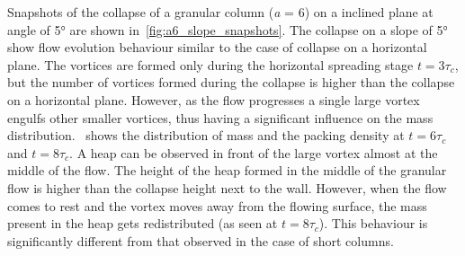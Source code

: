 Snapshots of the collapse of a granular column (\textit{a} = 6) on a inclined 
plane at angle of 5\si{\degree} are shown in~\cref{fig:a6_slope_snapshots}. 
The collapse on a slope of 5\si{\degree} show flow evolution behaviour similar 
to the case of collapse on a horizontal plane. The vortices are formed only 
during the horizontal spreading stage $t = 3\tau_c$, but the number of vortices 
formed during the collapse is higher than the collapse on a horizontal plane. 
However, as the flow progresses a single large vortex engulfs other smaller 
vortices, thus having a significant influence on the mass 
distribution.~ shows 
the distribution of mass and the packing density at $t = 6\tau_c$ and $t = 
8\tau_c$. A heap can be observed in front of the large vortex almost at the 
middle of the flow. The height of the heap formed in the middle of the granular 
flow is higher than the collapse height next to the wall. However, when the 
flow comes to rest and the vortex moves 
away from the flowing surface, the mass present in the heap gets redistributed 
(as seen at $t = 8\tau_c$). This behaviour is significantly different from that 
observed in the case of short columns. 

